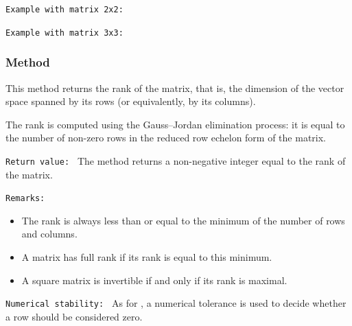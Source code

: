 \texttt{Example with matrix 2x2: }

\begin{tkzexample}[latex=.5\textwidth]
\end{tkzexample}

\texttt{Example with matrix 3x3: }

\begin{tkzexample}[latex=.5\textwidth]
\end{tkzexample}




\subsubsection{Method }
\label{ssub:method_matrix_rank}

This method returns the rank of the matrix, that is, the dimension of the vector space spanned by its rows (or equivalently, by its columns).

\medskip
The rank is computed using the Gauss–Jordan elimination process: it is equal to the number of non-zero rows in the reduced row echelon form of the matrix.

\medskip
\texttt{Return value: }
The method returns a non-negative integer equal to the rank of the matrix.

\medskip
\texttt{Remarks: }
\begin{itemize}
\item The rank is always less than or equal to the minimum of the number of rows and columns.
\item A matrix has full rank if its rank is equal to this minimum.
\item A square matrix is invertible if and only if its rank is maximal.
\end{itemize}

\medskip
\texttt{Numerical stability: }
As for , a numerical tolerance is used to decide whether a row should be considered zero.

